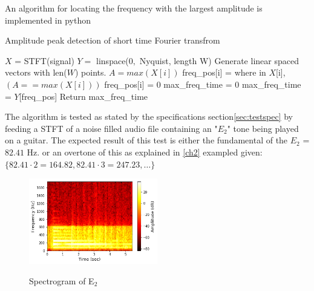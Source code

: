 An algorithm for locating the frequency with the largest amplitude  is implemented in python 
\begin{algorithm}[H]
\caption{Amplitude peak detection of short time Fourier transfrom}
\label{alg:FIR}
\begin{algorithmic}[1] 
\State  $X$ = STFT(signal) 
\State $Y =$ linspace($0,$ Nyquist, length W) \Comment Generate linear spaced vectors with len($W$) points.
		\State $A = max(X[i])$ 
		 
			\State freq\_pos[i] = where in $X$[i], $(A == max(X[i]))$ 
		\Else
			\State freq\_pos[i] = 0	
		\EndIf
			\State max\_freq\_time = 0
		\Else
			\State max\_freq\_time = $Y$[freq\_pos]
		\EndIf
	\EndFor
	\State Return max\_freq\_time
\EndProcedure
\end{algorithmic}
\end{algorithm}

The algorithm is tested as stated by the specifications section\ref{sec:testspec} by feeding a STFT of a noise filled audio file containing an "$E_2$" tone being played on a guitar. 
The expected result of this test is either the fundamental of the $E_2$ = $82.41$ Hz. or an overtone of this as explained in \ref{ch2} exampled given: $\{82.41 \cdot 2 = 164.82, 82.41 \cdot 3 = 247.23, \dots \}$ 

\begin{figure}[H]
\centering 
\includegraphics[width=0.5\textwidth]{figures/peak_detection/20170511_spectogram_E_2.png}
\label{fig:spec_E_2}
\caption{Spectrogram of E$_2$}
\end{figure}


